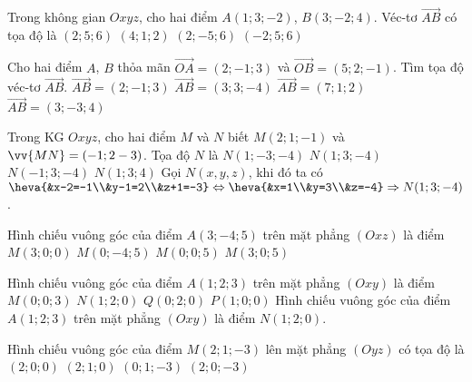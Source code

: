 \begin{ex}
	Trong không gian $ Oxyz $, cho hai điểm $ A(1;3;-2) $, $ B(3;-2;4) $. Véc-tơ $ \overrightarrow{AB} $ có tọa độ là
	\choice
	{\True $ (2;5;6) $}
	{$ (4;1;2) $}
	{\True $ (2;-5;6) $}
	{$ (-2;5;6) $}
\end{ex} 

\begin{ex}
	Cho hai điểm $A$, $B$ thỏa mãn $\vec{OA} = (2;-1; 3)$ và  $\vec{OB}= (5;2;-1)$. Tìm tọa độ véc-tơ $\vec{AB}$.
	\choice
	{$\vec{AB} =(2;-1;3)$}
	{\True  $\vec{AB} =(3;3;-4)$}
	{$\vec{AB} = (7;1;2)$}
	{$\vec{AB} =(3;-3;4)$}
\end{ex} 

\begin{ex}
	Trong KG $Oxyz$, cho hai điểm $M$ và $N$ biết $M(2;1;-1)$ và $\vv{MN}=(-1;2-3)$. Tọa độ $N$ là
	\choice
	{$N(1;-3;-4)$}
	{\True $N(1;3;-4)$}
	{$N(-1;3;-4)$}
	{$N(1;3;4)$}
	\loigiai
	{
		Gọi $N(x,y,z)$, khi đó ta có $\heva{&x-2=-1\\&y-1=2\\&z+1=-3}\Leftrightarrow \heva{&x=1\\&y=3\\&z=-4}\Rightarrow N(1;3;-4)$.\\
	}
\end{ex} 

\begin{ex}
	Hình chiếu vuông góc của điểm $A(3;-4;5)$ trên mặt phẳng $(Oxz)$ là điểm
	\choice
	{$M(3;0;0)$}
	{$M(0;-4;5)$}
	{$M(0;0;5)$}
	{\True $M(3;0;5)$}
\end{ex} 

\begin{ex}
	Hình chiếu vuông góc của điểm $A(1;2;3)$ trên mặt phẳng $(Oxy)$ là điểm
	\choice
	{$M(0;0;3)$}
	{\True $N(1;2;0)$}
	{$Q(0;2;0)$}
	{$P(1;0;0)$}
	\loigiai
	{
		Hình chiếu vuông góc của điểm $A(1;2;3)$ trên mặt phẳng $(Oxy)$ là điểm $N(1;2;0)$.
	}
\end{ex} 

\begin{ex}
	Hình chiếu vuông góc của điểm $M(2;1;-3)$ lên mặt phẳng $(Oyz)$ có tọa độ là
	\choice
	{$(2;0;0)$}
	{$(2;1;0)$}
	{\True $(0;1;-3)$}
	{$(2;0;-3)$}
\end{ex} 

